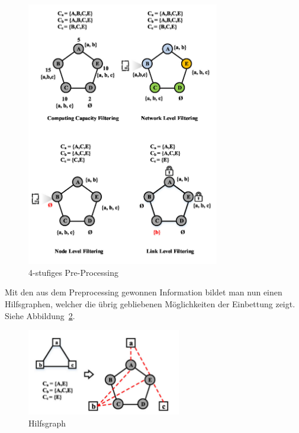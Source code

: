 \documentclass{lni}
\begin{document}
\begin{figure}[htb]
\begin{center}
\includegraphics[width=0.75\textwidth]{pre-processing.pdf}\newline
\caption{\label{graph8}4-stufiges Pre-Processing\cite{wang2016towards}}
\end{center}
\end{figure}

Mit den aus dem Preprocessing gewonnen Information bildet man nun einen Hilfsgraphen, welcher die übrig gebliebenen Möglichkeiten der Einbettung zeigt. Siehe Abbildung~\ref{graph9}.

\begin{figure}[htb]
\begin{center}
	\includegraphics[width=0.6\textwidth]{auxgraph.pdf}\newline 
	\caption{\label{graph9}Hilfsgraph \cite{wang2016towards}}
\end{center}
\end{figure}
\end{document}
